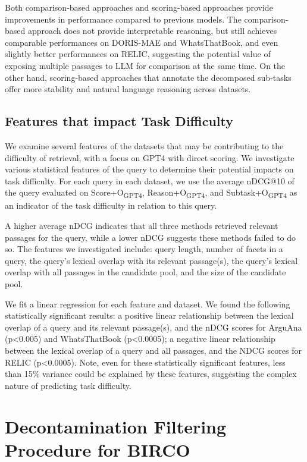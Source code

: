 \documentclass[11pt]{article}
\begin{document}
Both comparison-based approaches and scoring-based approaches provide improvements in performance compared to previous models. The comparison-based approach does not provide interpretable reasoning, but still achieves comparable performances on DORIS-MAE and WhatsThatBook, and even slightly better performances on RELIC, suggesting the potential value of exposing multiple passages to LLM for comparison at the same time. On the other hand, scoring-based approaches that annotate the decomposed sub-tasks offer more stability and natural language reasoning across datasets.

\subsection{Features that impact Task Difficulty}
We examine several features of the datasets that may be contributing to the difficulty of retrieval, with a focus on GPT4 with direct scoring. We investigate various statistical features of the query to determine their potential impacts on task difficulty. For each query in each dataset, we use the average nDCG@10 of the query evaluated on Score+O\textsubscript{GPT4}, Reason+O\textsubscript{GPT4}, and Subtask+O\textsubscript{GPT4} as an indicator of the task difficulty in relation to this query. 

A higher average nDCG indicates that all three methods retrieved relevant passages for the query, while a lower nDCG suggests these methods failed to do so. The features we investigated include: query length, number of facets in a query, the query's lexical overlap with its relevant passage(s), the query's lexical overlap with all passages in the candidate pool, and the size of the candidate pool. 

We fit a linear regression for each feature and dataset. We found the following statistically significant results: a positive linear relationship between the lexical overlap of a query and its relevant passage(s), and the nDCG scores for ArguAna (p<0.005) and WhatsThatBook (p<0.0005); a negative linear relationship between the lexical overlap of a query and all passages, and the NDCG scores for RELIC (p<0.0005). Note, even for these statistically significant features, less than 15\% variance could be explained by these features, suggesting the complex nature of predicting task difficulty. 

\section{Decontamination Filtering Procedure for BIRCO}
\label{sec: appendix_decontamination}
\end{document}
